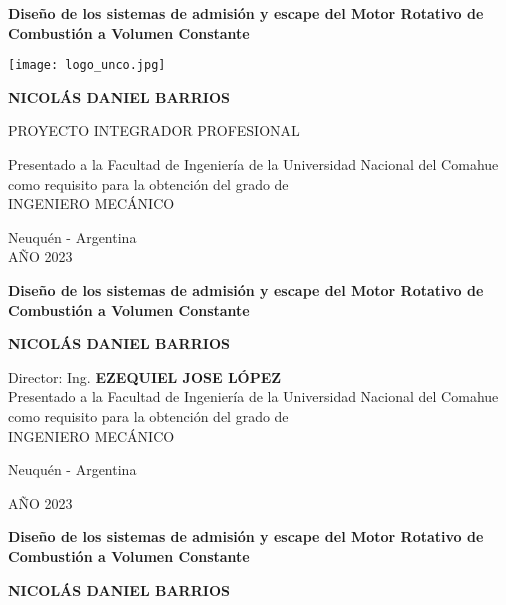 \thispagestyle{empty}

\begin{center}

\Large\textbf{{Diseño de los sistemas de admisión y escape del Motor Rotativo de Combustión a Volumen Constante\\}}

\vspace{1cm}

\texttt{[image: logo\_unco.jpg]}\\

\vspace{1cm}

\Large{\textbf{
NICOLÁS DANIEL BARRIOS\\
}}
\vspace{1cm}

PROYECTO INTEGRADOR PROFESIONAL\\

\vspace{1cm}

Presentado a la Facultad de Ingeniería de la Universidad Nacional del Comahue como requisito para la obtención del grado de \\ INGENIERO MECÁNICO

\vspace{0.5cm}

Neuquén - Argentina\\
AÑO 2023

\vspace{1cm}

\pagebreak
\thispagestyle{empty}

\Large\textbf{{Diseño de los sistemas de admisión y escape del Motor Rotativo de Combustión a Volumen Constante\\}}

\vspace{4cm}

\large{\textbf{
NICOLÁS DANIEL BARRIOS\\
}}

\vspace{4cm}
Director: Ing.  \textbf{EZEQUIEL JOSE LÓPEZ}\\


\vspace{3cm}
Presentado a la Facultad de Ingeniería de la Universidad Nacional del Comahue como requisito para la obtención del grado de \\ INGENIERO MECÁNICO

\vfill
Neuquén - Argentina

AÑO 2023

\newpage
\thispagestyle{plain}

\Large\textbf{{Diseño de los sistemas de admisión y escape del Motor Rotativo
    de Combustión a Volumen Constante \\}}

\vspace{3cm}

\large{\textbf{
NICOLÁS DANIEL BARRIOS
}}\\
\vspace{3cm}
\end{center}

